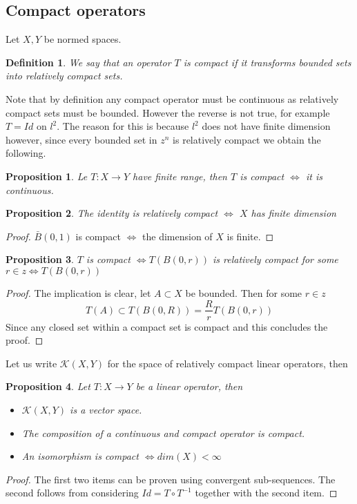 \documentclass[12pt]{article}
\newcommand{\R}zzzzz
\newtheorem{proposition}{Proposition}
\newtheorem{definition}{Definition}
\begin{document}
\subsection{Compact operators}
Let $X,Y$ be normed spaces.
\begin{definition}
	We say that an operator $T$ is compact if it transforms bounded sets into relatively compact sets.
\end{definition}
Note that by definition any compact operator must be continuous as relatively compact sets must be bounded. However the reverse is not true, for example $T=Id$ on $l^2$. The reason for this is because $l^2$ does not have finite dimension however, since every bounded set in $\R^n$ is relatively compact we obtain the following.
\begin{proposition}
	Le $T:X\to Y$ have finite range, then $T$ is compact $\iff$ it is continuous.
\end{proposition}
\begin{proposition}
	The identity is relatively compact $\iff$ $X$ has finite dimension
\end{proposition}
\begin{proof}
	$\bar{B}(0,1)$ is compact $\iff$ the dimension of $X$ is finite.
\end{proof}
\begin{proposition}
	$T$ is compact $\iff T(B(0,r))$ is relatively compact for some $r\in\R\iff T(B(0,r))$
\end{proposition}
\begin{proof}
	The implication is clear, let $A\subset X$ be bounded. Then for some $r\in\R$
	\begin{equation*}
		T(A)\subset T(B(0,R))=\frac{R}{r} T(B(0,r))
	\end{equation*}
	Since any closed set within a compact set is compact and this concludes the proof.
\end{proof}
Let us write $\mathcal{K}(X,Y)$ for the space of relatively compact linear operators, then
\begin{proposition}
	Let $T:X\to Y$ be a linear operator, then
	\begin{itemize}
		\item $\mathcal{K}(X,Y)$ is a vector space.
		\item The composition of a continuous and compact operator is compact.
		\item An isomorphism is compact $\iff dim(X)<\infty$
	\end{itemize}
\end{proposition}
\begin{proof}
	The first two items can be proven using convergent sub-sequences. The second follows from considering $Id=T\circ T^{-1}$ together with the second item.
\end{proof}
\end{document}
